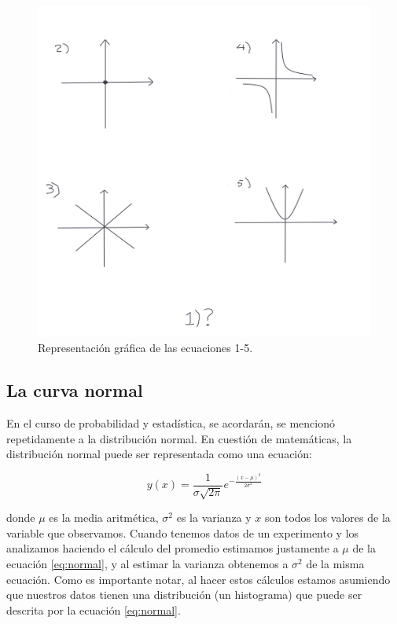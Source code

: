 \documentclass[
]{book}
\begin{document}
\begin{figure}

{\centering \includegraphics{Unidad-I/conicas} 

}

\caption{Representación gráfica de las ecuaciones 1-5.}\label{fig:conicas}
\end{figure}

\hypertarget{la-curva-normal}{%
\subsection{La curva normal}\label{la-curva-normal}}

En el curso de probabilidad y estadística, se acordarán, se mencionó repetidamente a la distribución normal. En cuestión de matemáticas, la distribución normal puede ser representada como una ecuación:

\begin{equation}
    y(x) = \frac{1}{\sigma \sqrt{2\pi}}e^{-\frac{(x-\mu)^2}{2\sigma^2}} \label{eq:normal}
\end{equation}

donde \(\mu\) es la media aritmética, \(\sigma^2\) es la varianza y \(x\) son todos los valores de la variable que observamos. Cuando tenemos datos de un experimento y los analizamos haciendo el cálculo del promedio estimamos justamente a \(\mu\) de la ecuación \eqref{eq:normal}, y al estimar la varianza obtenemos a \(\sigma^2\) de la misma ecuación. Como es importante notar, al hacer estos cálculos estamos asumiendo que nuestros datos tienen una distribución (un histograma) que puede ser descrita por la ecuación \eqref{eq:normal}.
\end{document}

